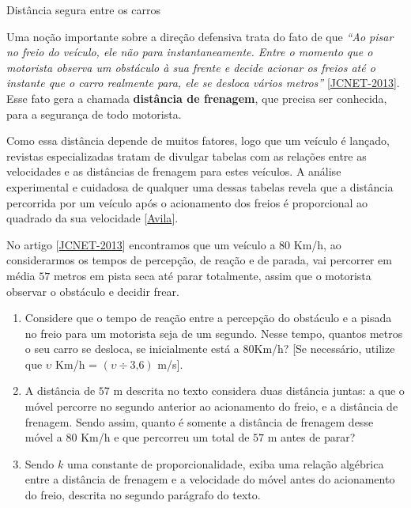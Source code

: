 \label{\detokenize{AF209-0:ativ-funcao-quadratica-distancia-frenagem}}
\begin{task}{Distância segura entre os carros}

Uma noção importante sobre a direção defensiva trata do fato de que \emph{“Ao pisar no freio do veículo, ele não para instantaneamente. Entre o momento que o motorista observa um obstáculo à sua frente e decide acionar os freios até o instante que o carro realmente para, ele se desloca vários metros”} [\href{https://www.jcnet.com.br/noticias/geral/2013/02/367699-direcao-defensiva--saiba-como-a-velocidade-influi-na-frenagem-do-veiculo.html}{JCNET-2013}]. Esse fato gera a chamada \textbf{distância de frenagem}, que precisa ser conhecida, para a segurança de todo motorista.

Como essa distância depende de muitos fatores, logo que um veículo é lançado, revistas especializadas tratam de divulgar tabelas com as relações entre as velocidades e as distâncias de frenagem para estes veículos. A análise experimental e cuidadosa de qualquer uma dessas tabelas revela que a distância percorrida por um veículo após o acionamento dos freios é proporcional ao quadrado da sua velocidade [\href{http://rpm.org.br/cdrpm/12/5.htm}{Avila}].

No artigo [\href{https://www.jcnet.com.br/noticias/geral/2013/02/367699-direcao-defensiva--saiba-como-a-velocidade-influi-na-frenagem-do-veiculo.html}{JCNET-2013}] encontramos que um veículo a \(80\) Km/h, ao considerarmos os tempos de percepção, de reação e de parada, vai percorrer em média \(57\) metros em pista seca até parar totalmente, assim que o motorista observar o obstáculo e decidir frear.
\begin{enumerate}
\item {} 
Considere que o tempo de reação entre a percepção do obstáculo e a pisada no freio para um motorista seja de um segundo. Nesse tempo, quantos metros o seu carro se desloca, se inicialmente está a 80Km/h? {[}Se necessário, utilize que \(\upsilon\) Km/h = \(( \upsilon \div 3\text{,}6 )\) m/s{]}.

\item {} 
A distância de \(57\) m descrita no texto considera duas distância juntas: a que o móvel percorre no segundo anterior ao acionamento do freio, e a distância de frenagem. Sendo assim, quanto é somente a distância de frenagem desse móvel a \(80\) Km/h e que percorreu um total de \(57\) m antes de parar?

\item {} 
Sendo \(k\) uma constante de proporcionalidade, exiba uma relação algébrica entre a distância de frenagem e a velocidade do móvel antes do acionamento do freio, descrita no segundo parágrafo do texto.


\end{enumerate}
\end{task}
